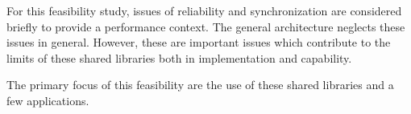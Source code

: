 \documentclass[11pt]{article}
\begin{document}
For this feasibility study, issues of reliability and synchronization are considered briefly to provide a performance context.   The general architecture neglects these issues in general.  However, these are important issues which contribute to the limits of these shared libraries both in implementation and capability.  

The primary focus of this feasibility are the use of these shared libraries and a few applications.  


 
\end{document}
